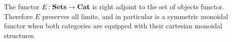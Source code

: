 \begin{lem}\label{lem:symmoncor}
The functor $E \colon \mathbf{Sets} \rightarrow \mathbf{Cat}$ is right adjoint to the set of objects functor. Therefore $E$ preserves all limits, and in particular is a symmetric monoidal functor when both categories are equipped with their cartesian monoidal structures.
\end{lem}
%
